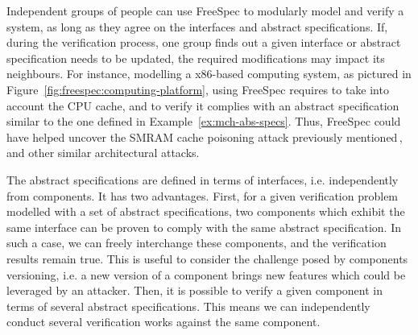 Independent groups of people can use FreeSpec to modularly model and verify a
system, as long as they agree on the interfaces and abstract specifications.
%
If, during the verification process, one group finds out a given interface or
abstract specification needs to be updated, the required modifications may
impact its neighbours.
%
For instance, modelling a x86-based computing system, as pictured in
Figure~\ref{fig:freespec:computing-platform}, using FreeSpec requires to take
into account the CPU cache, and to verify it complies with an abstract
specification similar to the one defined in Example~\ref{ex:mch-abs-specs}.
%
Thus, FreeSpec could have helped uncover the SMRAM cache poisoning attack
previously mentioned\,\cite{wojtczuk2009smram,duflot2009smram}, and other
similar architectural attacks.

The abstract specifications are defined in terms of interfaces, i.e.
independently from components.
%
It has two advantages.
%
First, for a given verification problem modelled with a set of abstract
specifications, two components which exhibit the same interface can be proven to
comply with the same abstract specification.
%
In such a case, we can freely interchange these components, and the verification
results remain true.
%
This is useful to consider the challenge posed by components versioning, i.e. a
new version of a component brings new features which could be leveraged by an
attacker.
%
Then, it is possible to verify a given component in terms of several abstract
specifications.
%
This means we can independently conduct several verification works against the
same component.
